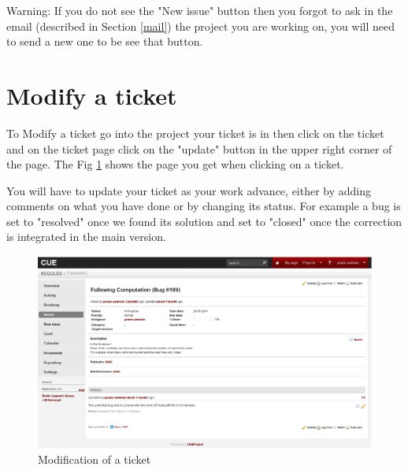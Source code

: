 \begin{WarningBlock}{Warning:}
If you do not see the "New issue" button then you forgot to ask in the email
(described in Section \ref{mail}) the project you are working on, you will need
to send a new one to be see that button.
\end{WarningBlock}
%
%
\section{Modify a ticket}
%
%
To Modify a ticket go into the project your ticket is in then click on the
ticket and on the ticket page click on the "update" button in the upper right
corner of the page. The Fig \ref{fig:cue-modify} shows the page you get when
clicking on a ticket.

You will have to update your ticket as your work advance, either by adding
comments on what you have done or by changing its status. For example a bug is
set to "resolved" once we found its solution and set to "closed" once the
correction is integrated in the main version.
%
\begin{figure}[H]
    \centering
    \includegraphics[scale=0.35]{graphics/cue-modify.png}
    \caption{Modification of a ticket}
    \label{fig:cue-modify}
\end{figure}
